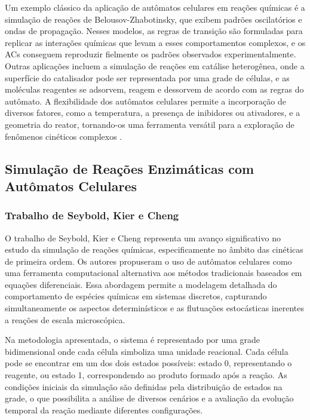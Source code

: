 \documentclass[12pt,oneside]{report}
\begin{document}
Um exemplo clássico da aplicação de autômatos celulares em reações químicas é a simulação de reações de Belousov-Zhabotinsky, que exibem padrões oscilatórios e ondas de propagação. Nesses modelos, as regras de transição são formuladas para replicar as interações químicas que levam a esses comportamentos complexos, e os ACs conseguem reproduzir fielmente os padrões observados experimentalmente. Outras aplicações incluem a simulação de reações em catálise heterogênea, onde a superfície do catalisador pode ser representada por uma grade de células, e as moléculas reagentes se adsorvem, reagem e dessorvem de acordo com as regras do autômato. A flexibilidade dos autômatos celulares permite a incorporação de diversos fatores, como a temperatura, a presença de inibidores ou ativadores, e a geometria do reator, tornando-os uma ferramenta versátil para a exploração de fenômenos cinéticos complexos \cite{kier2005}.

\subsection{Simulação de Reações Enzimáticas com Autômatos Celulares}

\subsubsection{Trabalho de Seybold, Kier e Cheng \citeyear{seybold1997simulation}}

O trabalho de Seybold, Kier e Cheng \cite{seybold1997simulation} representa um avanço significativo no estudo da simulação de reações químicas, especificamente no âmbito das cinéticas de primeira ordem. Os autores propuseram o uso de autômatos celulares como uma ferramenta computacional alternativa aos métodos tradicionais baseados em equações diferenciais. Essa abordagem permite a modelagem detalhada do comportamento de espécies químicas em sistemas discretos, capturando simultaneamente os aspectos determinísticos e as flutuações estocásticas inerentes a reações de escala microscópica.

Na metodologia apresentada, o sistema é representado por uma grade bidimensional onde cada célula simboliza uma unidade reacional. Cada célula pode se encontrar em um dos dois estados possíveis: estado 0, representando o reagente, ou estado 1, correspondendo ao produto formado após a reação. As condições iniciais da simulação são definidas pela distribuição de estados na grade, o que possibilita a análise de diversos cenários e a avaliação da evolução temporal da reação mediante diferentes configurações.
\end{document}

